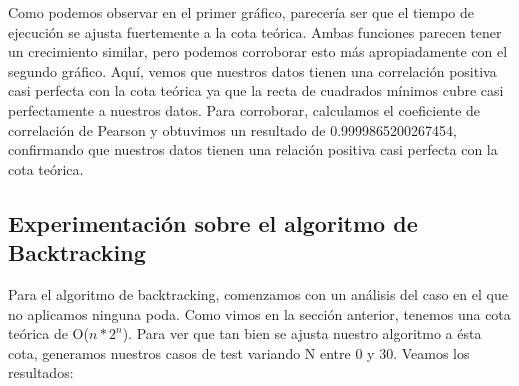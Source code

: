 Como podemos observar en el primer gráfico, parecería ser que el tiempo de ejecución se ajusta fuertemente a la cota teórica. Ambas funciones parecen tener un crecimiento similar, pero podemos corroborar esto más apropiadamente con el segundo gráfico. Aquí, vemos que nuestros datos tienen una correlación positiva casi perfecta con la cota teórica ya que la recta de cuadrados mínimos cubre casi perfectamente a nuestros datos. Para corroborar, calculamos el coeficiente de correlación de Pearson y obtuvimos un resultado de 0.9999865200267454, confirmando que nuestros datos tienen una relación positiva casi perfecta con la cota teórica.
\label{sec:experimentacion}



\subsection{Experimentación sobre el algoritmo de Backtracking}
Para el algoritmo de backtracking, comenzamos con un análisis del caso en el que no aplicamos ninguna poda. Como vimos en la sección anterior, tenemos una cota teórica de O($n*2^{n}$). Para ver que tan bien se ajusta nuestro algoritmo a ésta cota, generamos nuestros casos de test variando N entre 0 y 30. Veamos los resultados:

